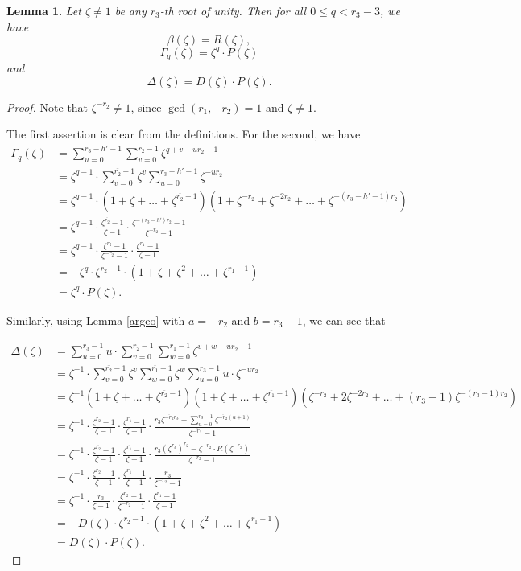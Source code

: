 \documentclass[12pt,a4paper]{article}
\newtheorem{lemma}[theorem]{Lemma}
\theoremstyle{definition}
\newcommand{\z}{\zeta}
\newcommand{\uo}{\overline{r_2}}
\newcommand{\vo}{\overline{r_1}}
\begin{document}
\begin{lemma}
Let $\zeta\neq 1$ be any $r_3$-th root of unity. Then for all $0\leq q<r_3-3$, we have $$\beta(\z)=R(\z),$$ $$\Gamma_q(\zeta)=\zeta^{q}\cdot P(\zeta)$$ and $$\Delta(\zeta)=D(\zeta)\cdot P(\zeta).$$
\end{lemma}
\begin{proof}
Note that $\z^{-r_2}\neq 1$, since $\gcd(r_1,-r_2)=1$ and $\z\neq1$.

The first assertion is clear from the definitions. For the second, we have
\begin{equation*}\label{Gamma}
\begin{split}
\Gamma_q(\zeta)&=\sum_{u=0}^{r_3-h'-1}\sum_{v=0}^{\uo-1}\z^{q+v-ur_2-1}\\
&=\z^{q-1}\cdot\sum_{v=0}^{\uo-1}\z^{v}\sum_{u=0}^{r_3-h'-1}\z^{-ur_2}\\
&=\z^{q-1}\cdot(1+\zeta+\dots+\zeta^{\uo-1})(1+\zeta^{-r_2}+\zeta^{-2r_2}+\dots+\zeta^{-(r_3-h'-1)r_2})\\
&=\zeta^{q-1}\cdot\frac{\zeta^{\uo}-1}{\zeta-1}\cdot \frac{\zeta^{-(r_3-h')r_2}-1}{\zeta^{-r_2}-1}\\
&=\zeta^{q-1}\cdot\frac{\zeta^{r_2}-1}{\zeta^{-r_2}-1}\cdot \frac{\zeta^{r_1}-1}{\zeta-1}\\
&=-\zeta^{q}\cdot \zeta^{r_2-1}\cdot (1+\zeta+\zeta^2+\dots+\zeta^{r_1-1})\\
&=\zeta^{q}\cdot P(\zeta).
\end{split}
\end{equation*}

Similarly, using Lemma \ref{argeo} with $a=\overline{-r_2}$ and $b=r_3-1$, we can see that

\begin{equation*}\label{Delta}
\begin{split}
\Delta(\zeta)&=
\sum_{u=0}^{r_3-1}u\cdot\sum_{v=0}^{\uo-1} \sum _{w=0}^{\vo-1} \z^{v+w-ur_2-1}\\
&=\z^{-1}\cdot\sum_{v=0}^{\uo-1}\z^v \sum _{w=0}^{\vo-1} \z^{w}\sum_{u=0}^{r_3-1}u\cdot\z^{-ur_2}\\
&=\z^{-1}(1+\z+\!\dots\!+\z^{\uo-1})(1\!+\z+\!\dots\!+\z^{\vo-1})(\z^{-r_2}+2\z^{-2r_2}+\!\dots\!+(r_3-1)\z^{-(r_3-1)r_2})\\
&=\z^{-1} \cdot \frac{\zeta^{\uo}-1}{\zeta-1}\cdot \frac{\zeta^{\vo}-1}{\zeta-1}\cdot \frac{r_3\z^{\overline{-r_2}r_3}-\sum_{u=0}^{r_3-1}\z^{\overline{-r_2}(u+1)}}{\z^{\overline{-r_2}}-1}
\\
&=\z^{-1} \cdot \frac{\zeta^{\uo}-1}{\zeta-1}\cdot \frac{\zeta^{\vo}-1}{\zeta-1}\cdot \frac{r_3(\z^{r_3})^{r_2}-\zeta^{-r_2}\cdot R(\zeta^{-r_2})}{\z^{-r_2}-1}
\\
&=\z^{-1}\cdot\frac{\zeta^{r_2}-1}{\zeta-1}\cdot \frac{\zeta^{r_1}-1}{\zeta-1} \cdot \frac{r_3}{\zeta^{-r_2}-1}\\
&=\z^{-1}\cdot\frac{r_3}{\zeta-1}\cdot \frac{\zeta^{r_2}-1}{\zeta^{-r_2}-1}\cdot \frac{\zeta^{r_1}-1}{\zeta-1}\\
&=-D(\zeta)\cdot \zeta^{r_2-1}\cdot (1+\zeta+\zeta^2+\dots+\zeta^{r_1-1})\\
&=D(\zeta)\cdot P(\zeta).
\end{split}
\end{equation*}
\end{proof}
\end{document}
